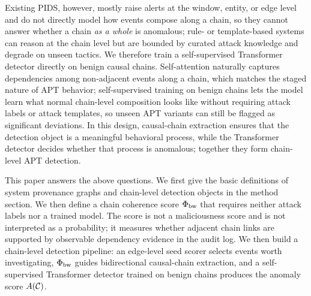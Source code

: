 Existing PIDS, however, mostly raise alerts at the window, entity, or edge level and do not directly model how events compose along a chain, so they cannot answer whether a chain \emph{as a whole} is anomalous; rule- or template-based systems can reason at the chain level but are bounded by curated attack knowledge and degrade on unseen tactics. We therefore train a self-supervised Transformer detector directly on benign causal chains. Self-attention naturally captures dependencies among non-adjacent events along a chain, which matches the staged nature of APT behavior; self-supervised training on benign chains lets the model learn what normal chain-level composition looks like without requiring attack labels or attack templates, so unseen APT variants can still be flagged as significant deviations. In this design, causal-chain extraction ensures that the detection object is a meaningful behavioral process, while the Transformer detector decides whether that process is anomalous; together they form chain-level APT detection.

This paper answers the above questions. We first give the basic definitions of system provenance graphs and chain-level detection objects in the method section. We then define a chain coherence score $\Phi_{\text{bw}}$ that requires neither attack labels nor a trained model. The score is not a maliciousness score and is not interpreted as a probability; it measures whether adjacent chain links are supported by observable dependency evidence in the audit log. We then build a chain-level detection pipeline: an edge-level seed scorer selects events worth investigating, $\Phi_{\text{bw}}$ guides bidirectional causal-chain extraction, and a self-supervised Transformer detector trained on benign chains produces the anomaly score $A(\mathcal{C})$.

